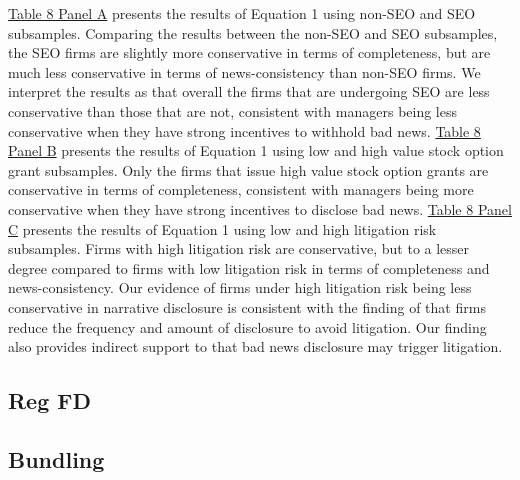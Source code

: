 \documentclass[letterpaper,11pt]{article}
\begin{document}
\begin{spacing}{1.5}
\hyperref[T8]{Table 8 Panel A} presents the results of Equation 1 using non-SEO and SEO subsamples. Comparing the results between the non-SEO and SEO subsamples, the SEO firms are slightly more conservative in terms of completeness, but are much less conservative in terms of news-consistency than non-SEO firms. We interpret the results as that overall the firms that are undergoing SEO are less conservative than those that are not, consistent with managers being less conservative when they have strong incentives to withhold bad news. \hyperref[T8]{Table 8 Panel B} presents the results of Equation 1 using low and high value stock option grant subsamples. Only the firms that issue high value stock option grants are conservative in terms of completeness, consistent with managers being more conservative when they have strong incentives to disclose bad news. \hyperref[T8]{Table 8 Panel C} presents the results of Equation 1 using low and high litigation risk subsamples. Firms with high litigation risk are conservative, but to a lesser degree compared to firms with low litigation risk in terms of completeness and news-consistency. Our evidence of firms under high litigation risk being less conservative in narrative disclosure is consistent with the finding of  that firms reduce the frequency and amount of disclosure to avoid litigation. Our finding also provides indirect support to  that bad news disclosure may trigger litigation.

\subsection{Reg FD}

\subsection{Bundling}


\end{spacing}
\end{document}
